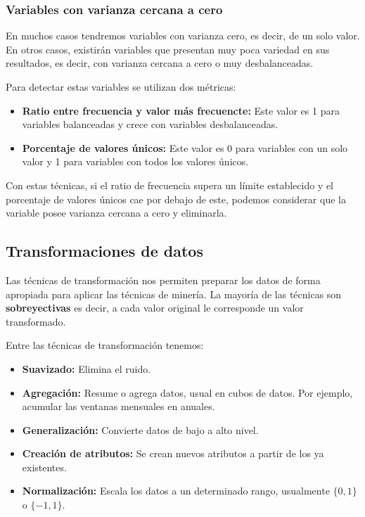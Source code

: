 \documentclass[12pt, letterpaper]{article}
\begin{document}
\subsubsection{Variables con varianza cercana a cero}
En muchos casos tendremos variables con varianza cero, es decir, de un solo valor. En otros casos, existirán variables que presentan muy poca variedad en sus resultados, es decir, con varianza cercana a cero o muy desbalanceadas. 

Para detectar estas variables se utilizan dos métricas:
\begin{itemize}
    \item \textbf{Ratio entre frecuencia y valor más frecuencte:} Este valor es 1 para variables balanceadas y crece con variables desbalanceadas.
    \item \textbf{Porcentaje de valores únicos:} Este valor es 0 para variables con un solo valor y 1 para variables con todos los valores únicos.
\end{itemize}

Con estas técnicas, si el ratio de frecuencia supera un límite establecido y el porcentaje de valores únicos cae por debajo de este, podemos considerar que la variable posee varianza cercana a cero y eliminarla.


\subsection{Transformaciones de datos}
Las técnicas de transformación nos permiten preparar los datos de forma apropiada para aplicar las técnicas de minería. La mayoría de las técnicas son \textbf{sobreyectivas} es decir, a cada valor original le corresponde un valor transformado.

Entre las técnicas de transformación tenemos:
\begin{itemize}
    \item \textbf{Suavizado:} Elimina el ruido.
    \item \textbf{Agregación:} Resume o agrega datos, usual en cubos de datos. Por ejemplo, acumular las ventanas mensuales en anuales.
    \item \textbf{Generalización:} Convierte datos de bajo a alto nivel.
    \item \textbf{Creación de atributos:} Se crean nuevos atributos a partir de los ya existentes.
    \item \textbf{Normalización:} Escala los datos a un determinado rango, usualmente $\{0,1\}$ o $\{-1,1\}$.
\end{itemize}
\end{document}
